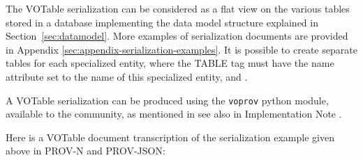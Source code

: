 The VOTable serialization can be considered as a flat view on the various tables stored in a database implementing the data model structure explained in Section~\ref{sec:datamodel}.
More examples of serialization documents are provided in Appendix \ref{sec:appendix-serialization-examples}.
It is possible to create separate tables for each specialized entity, where the TABLE tag must have the name attribute set to the name of this specialized entity, and .

A VOTable serialization can be produced using the \texttt{voprov} python module, available to the community, as mentioned in see also in Implementation Note \citep[]{std:ProvenanceImplementationNote}.


Here is a VOTable document transcription of the serialization example given above in PROV-N and PROV-JSON:



